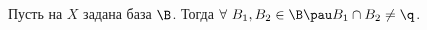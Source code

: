 \label{markov}
 	Пусть на $X$ задана база $\B$. Тогда $\forall\  B_1, B_2 \in \B \pau B_1\cap B_2 \neq \q$.
 